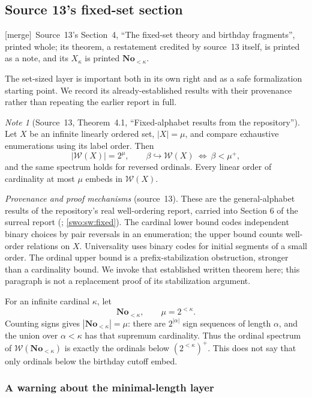 \documentclass[11pt]{article}
\theoremstyle{definition}
\theoremstyle{remark}
\newtheorem{note}[note]{Note}
\newcommand{\No}{\mathbf{No}}
\newcommand{\W}{\mathcal W}
\newcommand{\emb}{\hookrightarrow}
\newcommand{\merge}{\textsf{[merge]}}
\begin{document}
\subsection{Source 13's fixed-set section}\label{swo:fs:swf:sec:fixed}

\merge\ Source~13's Section~4, ``The fixed-set theory and birthday
fragments'', printed whole; its theorem, a restatement credited by source~13
itself, is printed as a note, and its $X_\kappa$ is printed $\No_{<\kappa}$.

The set-sized layer is important both in its own right and as a safe
formalization starting point. We record its already-established results
with their provenance rather than repeating the earlier report in full.

\begin{note}[Source~13, Theorem~4.1, ``Fixed-alphabet results from the repository'']\label{swo:fs:swf:thm:fixed}
Let $X$ be an infinite linearly ordered set, $|X|=\mu$, and compare
exhaustive enumerations using its label order. Then
\[
 |\W(X)|=2^\mu,
 \qquad
 \beta\emb\W(X)\ \Longleftrightarrow\ \beta<\mu^+,
\]
and the same spectrum holds for reversed ordinals. Every linear order
of cardinality at most $\mu$ embeds in $\W(X)$.
\par\emph{Provenance and proof mechanisms} (source~13).
These are the general-alphabet results of the repository's real
well-ordering report, carried into Section 6 of the surreal report
(\cite{ProveItReals}; \cref{swo:sw:fixed}). The cardinal lower bound codes independent
binary choices by pair reversals in an enumeration; the upper bound
counts well-order relations on $X$. Universality uses binary codes for
initial segments of a small order. The ordinal upper bound is a
prefix-stabilization obstruction, stronger than a cardinality bound.
We invoke that established written theorem here; this paragraph is not
a replacement proof of its stabilization argument.
\end{note}

For an infinite cardinal $\kappa$, let
\[
       \No_{<\kappa},\qquad \mu=2^{<\kappa}.
\]
Counting signs gives $|\No_{<\kappa}|=\mu$: there are $2^{|\alpha|}$ sign
sequences of length $\alpha$, and the union over $\alpha<\kappa$ has
that supremum cardinality. Thus the ordinal spectrum of
$\W(\No_{<\kappa})$ is exactly the ordinals below $(2^{<\kappa})^+$.
This does not say that only ordinals below the birthday cutoff embed.

\subsubsection{A warning about the minimal-length layer}
\end{document}
